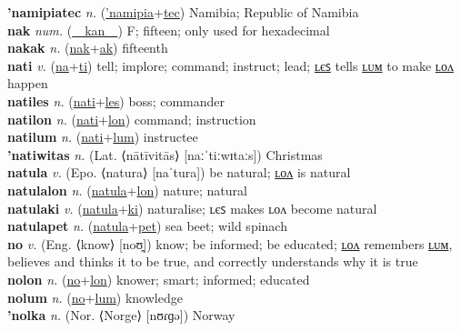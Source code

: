 \textbf{'namipiatec} \textit{n.} (\hyperref['namipia]{'namipia}+\hyperref[tec]{tec})
Namibia; Republic of Namibia \label{'namipiatec} \\
\textbf{nak} \textit{num.} (\hyperref[kan]{~~kan~~})
F; fifteen; only used for hexadecimal \label{nak} \\
\textbf{nakak} \textit{n.} (\hyperref[nak]{nak}+\hyperref[ak]{ak})
fifteenth \label{nakak} \\
\textbf{nati} \textit{v.} (\hyperref[na]{na}+\hyperref[ti]{ti})
tell; implore; command; instruct; lead; \hyperref[natiles]{ʟєꜱ} tells \hyperref[natilum]{ʟᴜᴍ} to make \hyperref[natilon]{ʟᴏᴧ} happen \label{nati} \\
\textbf{natiles} \textit{n.} (\hyperref[nati]{nati}+\hyperref[les]{les})
boss; commander \label{natiles} \\
\textbf{natilon} \textit{n.} (\hyperref[nati]{nati}+\hyperref[lon]{lon})
command; instruction \label{natilon} \\
\textbf{natilum} \textit{n.} (\hyperref[nati]{nati}+\hyperref[lum]{lum})
instructee \label{natilum} \\
\textbf{'natiwitas} \textit{n.} (Lat. ⟨nātīvitās⟩ [naːˈtiːwɪtaːs])
Christmas \label{'natiwitas} \\
\textbf{natula} \textit{v.} (Epo. ⟨natura⟩ [naˈtura])
be natural; \hyperref[natulalon]{ʟᴏᴧ} is natural \label{natula} \\
\textbf{natulalon} \textit{n.} (\hyperref[natula]{natula}+\hyperref[lon]{lon})
nature; natural \label{natulalon} \\
\textbf{natulaki} \textit{v.} (\hyperref[natula]{natula}+\hyperref[ki]{ki})
naturalise; ʟєꜱ makes ʟᴏᴧ become natural \label{natulaki} \\
\textbf{natulapet} \textit{n.} (\hyperref[natula]{natula}+\hyperref[pet]{pet})
sea beet; wild spinach \label{natulapet} \\
\textbf{no} \textit{v.} (Eng. ⟨know⟩ [noʊ̯])
know; be informed; be educated; \hyperref[nolon]{ʟᴏᴧ} remembers \hyperref[nolum]{ʟᴜᴍ}, believes and thinks it to be true, and correctly understands why it is true \label{no} \\
\textbf{nolon} \textit{n.} (\hyperref[no]{no}+\hyperref[lon]{lon})
knower; smart; informed; educated \label{nolon} \\
\textbf{nolum} \textit{n.} (\hyperref[no]{no}+\hyperref[lum]{lum})
knowledge \label{nolum} \\
\textbf{'nolka} \textit{n.} (Nor. ⟨Norge⟩ [nʊɾɡə])
Norway \label{'nolka} \\
